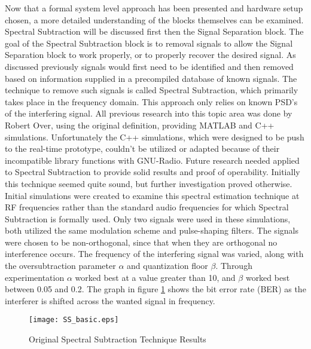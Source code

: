 Now that a formal system level approach has been presented and hardware setup chosen, a more detailed understanding of the blocks themselves can be examined.  Spectral Subtraction will be discussed first then the Signal Separation block.  The goal of the Spectral Subtraction block is to removal signals to allow the Signal Separation block to work properly, or to properly recover the desired signal.  As discussed previously signals would first need to be identified and then removed based on information supplied in a precompiled database of known signals.  The technique to remove such signals is called Spectral Subtraction, which primarily takes place in the frequency domain.  This approach only relies on known PSD's of the interfering signal.  All previous research into this topic area was done by Robert Over, using the original definition, providing MATLAB and C++ simulations.  Unfortunately the C++ simulations, which were designed to be push to the real-time prototype, couldn't be utilized or adapted because of their incompatible library functions with GNU-Radio.  Future research needed applied to Spectral Subtraction to provide solid results and proof of operability.  Initially this technique seemed quite sound, but further investigation proved otherwise.\\

Initial simulations were created to examine this spectral estimation technique at RF frequencies rather than the standard audio frequencies for which Spectral Subtraction is formally used.  Only two signals were used in these simulations, both utilized the same modulation scheme and pulse-shaping filters.  The signals were chosen to be non-orthogonal, since that when they are orthogonal no interference occurs.  The frequency of the interfering signal was varied, along with the oversubtraction parameter \(\alpha\) and quantization floor \(\beta\).  Through experimentation \(\alpha\) worked best at a value greater than 10, and \(\beta\) worked best between 0.05 and 0.2.  The graph in figure \ref{SS_basic} shows the bit error rate (BER) as the interferer is shifted across the wanted signal in frequency.\\

\begin{figure}\label{SS_basic}
\centering
\texttt{[image: SS\_basic.eps]}
\caption{Original Spectral Subtraction Technique Results}
\end{figure} 

